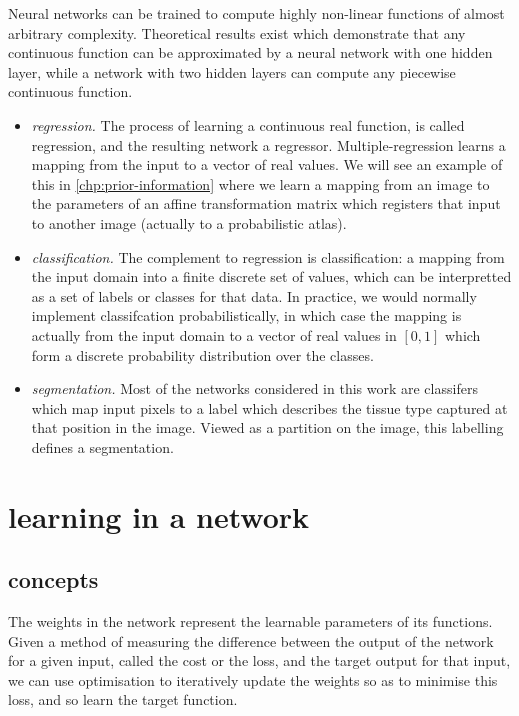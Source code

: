 \documentclass[msc]{infthesis}
\begin{document}
Neural networks can be trained to compute highly non-linear functions of almost arbitrary
complexity.  Theoretical results exist which demonstrate that any continuous function can be
approximated by a neural network with one hidden layer, while a network with two hidden layers
can compute any piecewise continuous function.\cite{csaji2001approximation}

\begin{itemize}
    \item \emph{regression.}
    The process of learning a continuous real function, is called regression, and the resulting
    network a regressor.  Multiple-regression learns a mapping from the input to a vector of
    real values.  We will see an example of this in \ref{chp:prior-information} where we
    learn a mapping from an image to the parameters of an affine transformation matrix which
    registers that input to another image (actually to a probabilistic atlas).

    \item \emph{classification.}
    The complement to regression is classification: a mapping from the input domain into a 
    finite discrete set of values, which can be interpretted as a set of labels or classes for
    that data.  In practice, we would normally implement classifcation probabilistically, in
    which case the mapping is actually from the input domain to a vector of real values in 
    \([0,1]\) which form a discrete probability distribution over the classes.

    \item \emph{segmentation.}
    Most of the networks considered in this work are classifers which map input pixels to 
    a label which describes the tissue type captured at that position in the image.  Viewed
    as a partition on the image, this labelling defines a segmentation.
\end{itemize}




\section{learning in a network}
\label{sec:classification:2}


\subsection{concepts}
\label{sec:classification:concepts}
The weights in the network represent the learnable parameters of its functions.  Given a method of measuring
the difference between the output of the network for a given input, called the cost or the loss, 
and the target output for that input, we can use optimisation to iteratively update the weights so 
as to minimise this loss, and so learn the target function.
\end{document}
